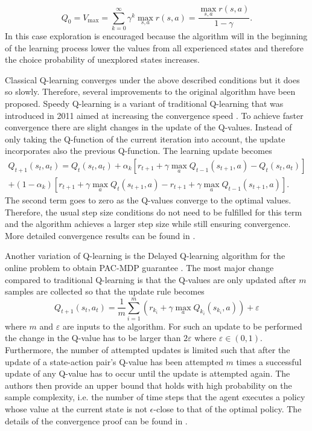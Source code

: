 \documentclass[../main.tex]{subfiles}
\begin{document}
\begin{equation}\label{eq:optimistic_init}
    Q_0 = V_{\max} = \sum_{k=0}^\infty \gamma^k\max_{s,a}r(s,a) = \dfrac{\max_{s,a}{r(s,a)}}{1-\gamma}.
\end{equation}
In this case exploration is encouraged because the algorithm will in the beginning of the learning process lower the values from all experienced states and therefore the choice probability of unexplored states increases. \par
Classical Q-learning converges under the above described conditions but it does so slowly. Therefore, several improvements to the original algorithm have been proposed. Speedy Q-learning is a variant of traditional Q-learning that was introduced in 2011 aimed at increasing the convergence speed \cite{azar2011speedy}. To achieve faster convergence there are slight changes in the update of the Q-values. Instead of only taking the Q-function of the current iteration into account, the update incorporates also the previous Q-function. The learning update becomes
\begin{multline}
Q_{t+1}(s_t,a_t) = Q_{t}(s_t,a_t) + \alpha_k \left[ r_{t+1}+\gamma \max_a Q_{t-1}(s_{t+1},a) - Q_{t}(s_t,a_t)\right] \\+ (1-\alpha_k) \left[ r_{t+1}+\gamma \max_a Q_{t}(s_{t+1},a) -  r_{t+1}+\gamma \max_a Q_{t-1}(s_{t+1},a)\right].
\end{multline}
The second term goes to zero as the Q-values converge to the optimal values. Therefore, the usual step size conditions do not need to be fulfilled for this term and the algorithm achieves a larger step size while still ensuring convergence. More detailed convergence results can be found in \cite{azar2011speedy}.\par
Another variation of Q-learning is the Delayed Q-learning algorithm for the online problem to obtain PAC-MDP guarantee \cite{strehl2006pac}. The most major change compared to traditional Q-learning is that the Q-values are only updated after $m$ samples are collected so that the update rule becomes
\begin{equation}\label{DelayedQ}
Q_{t+1}(s_t,a_t) = \dfrac{1}{m} \sum_{i=1}^m \left( r_{k_i} + \gamma \max_{a} Q_{k_i}(s_{k_i},a) \right) + \varepsilon
\end{equation}
where $m$ and $\varepsilon$ are inputs to the algorithm.
For such an update to be performed the change in the Q-value has to be larger than $2\varepsilon$ where $\varepsilon \in (0,1)$. Furthermore, the number of attempted updates is limited such that after the update of a state-action pair's Q-value has been attempted $m$ times a successful update of any Q-value has to occur until the update is attempted again. The authors then provide an upper bound that holds with high probability on the sample complexity, i.e. the number of time steps that the agent executes a policy whose value at the current state is not $\epsilon$-close to that of the optimal policy. The details of the convergence proof can be found in \cite{strehl2006pac}.\par
\end{document}
